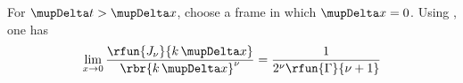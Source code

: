 \documentclass[a4paper]{article}
\numberwithin{equation}{subsection}
\begin{document}
For $\mupDelta t > \mupDelta x$, choose a frame in which $\mupDelta x = 0$.
Using \cite[eq.\ (10.2.2)]{NIST:DLMF}, one has
\begin{align}
\lim_{x\to 0}\frac{\rfun{J_{\nu}}{k\,\mupDelta x}}%
	{\rbr{k\,\mupDelta x}^{{\nu}}} = \frac{1}{2^{\nu}\rfun{\Gamma}{\nu+1}}
\end{align}

%


\printbibheading
\printbibliography
\end{document}
